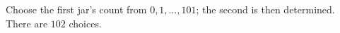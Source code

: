 Choose the first jar's count from $0,1,\ldots,101$; the second is then determined. There are $\boxed{102}$ choices.
